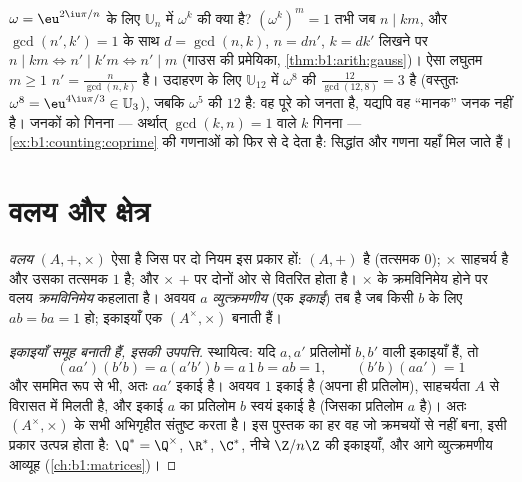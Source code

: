\begin{example}[$\mathbb U_{12}$ के भीतर कोटियाँ]\label{ex:b1:structures:orderU12}
$\omega = \eu^{2\iu\pi/n}$ के लिए $\mathbb U_n$ में $\omega^k$ की  क्या
है? $(\omega^k)^m = 1$ तभी जब $n \mid km$, और $\gcd(n', k') = 1$ के साथ $d =
\gcd(n, k)$, $n = dn'$, $k = dk'$ लिखने पर $n \mid km \iff n' \mid k'm \iff
n' \mid m$ (गाउस की प्रमेयिका, \cref{thm:b1:arith:gauss})। ऐसा लघुतम $m \geq
1$ $n' = \frac{n}{\gcd(n,k)}$ है। उदाहरण के लिए $\mathbb U_{12}$ में
$\omega^8$ की  $\frac{12}{\gcd(12,8)} = 3$ है (वस्तुतः $\omega^8 =
\eu^{4\iu\pi/3} \in \mathbb U_3$), जबकि $\omega^5$ की  $12$ है: वह पूरे
 को जनता है, यद्यपि वह ``मानक'' जनक नहीं है। जनकों को गिनना --- अर्थात्
$\gcd(k, n) = 1$ वाले $k$ गिनना --- \cref{ex:b1:counting:coprime} की
 गणनाओं को फिर से दे देता है:  सिद्धांत और गणना यहाँ मिल जाते
हैं।
\end{example}

\section{वलय और क्षेत्र}

\begin{definition}[वलय]\label{def:b1:structures:ring}
\emph{वलय} $(A, +, \times)$ ऐसा  है जिस पर दो नियम इस
प्रकार हों: $(A, +)$  है (तत्समक $0$); $\times$ साहचर्य है और उसका
तत्समक $1$ है; और $\times$ $+$ पर दोनों ओर से वितरित होता है। $\times$ के
क्रमविनिमेय होने पर वलय \emph{क्रमविनिमेय} कहलाता है। अवयव $a$
\emph{व्युत्क्रमणीय} (एक \emph{इकाई}) तब है जब किसी $b$ के लिए $ab = ba = 1$
हो; इकाइयाँ एक  $(A^\times, \times)$ बनाती हैं।
\end{definition}

\begin{proof}[इकाइयाँ समूह बनाती हैं, इसकी उपपत्ति]
स्थायित्व: यदि $a, a'$ प्रतिलोमों $b, b'$ वाली इकाइयाँ हैं, तो
\[
(aa')(b'b) = a(a'b')b = a\,1\,b = ab = 1,
\qquad (b'b)(aa') = 1
\]
और सममित रूप से भी, अतः $aa'$ इकाई है। अवयव $1$ इकाई है (अपना ही प्रतिलोम),
साहचर्यता $A$ से विरासत में मिलती है, और इकाई $a$ का प्रतिलोम $b$ स्वयं इकाई
है (जिसका प्रतिलोम $a$ है)। अतः $(A^\times, \times)$  के सभी अभिगृहीत
संतुष्ट करता है। इस पुस्तक का हर वह  जो क्रमचयों से नहीं बना, इसी प्रकार
उत्पन्न होता है: $\Q^* = \Q^\times$, $\R^*$, $\C^*$, नीचे $\Z/n\Z$ की
इकाइयाँ, और आगे व्युत्क्रमणीय आव्यूह (\cref{ch:b1:matrices})।
\end{proof}

